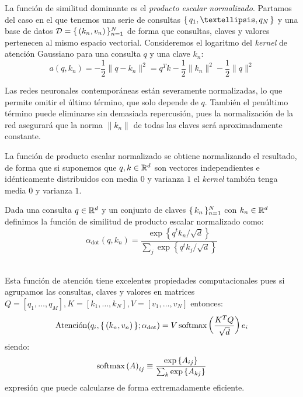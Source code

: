 La función de similitud dominante es el \textit{producto escalar normalizado}. Partamos del caso en el que tenemos una serie de consultas \( \Set{ q_1, …, q_N} \) y una base de datos \( \mathcal{D} = \{\,(k_n, v_n)\,\}_{n = 1}^N \) de forma que consultas, claves y valores pertenecen al mismo espacio vectorial. Consideremos el logaritmo del \textit{kernel} de atención Gaussiano para una consulta \( q \) y una clave \( k_{n} \):
\[
    a(q, k_n) = -\frac{1}{2} \|q - k_n\|^2  = q^T k - \frac{1}{2} \| k_n \|^2 - \frac{1}{2} \| q \|^2
\]

Las redes neuronales contemporáneas están severamente normalizadas, lo que permite omitir el último término, que solo depende de \( q \). También el penúltimo término puede eliminarse sin demasiada repercusión, pues la normalización de la red asegurará que la norma \( \| k_n \| \) de todas las claves será aproximadamente constante.

La función de producto escalar normalizado se obtiene normalizando el resultado, de forma que si suponemos que \( q, k \in \mathbb{R}^{d} \) son vectores independientes e idénticamente distribuidos con media \( 0 \) y varianza \( 1 \) el \textit{kernel} también tenga media \( 0 \) y varianza \( 1 \).

\begin{definition}
Dada una consulta \( q \in \mathbb{R}^{d}\) y un conjunto de claves \( \{\,k_n\,\}_{n = 1}^N \) con \( k_n \in \mathbb{R}^{d} \) definimos la función de similitud de producto escalar normalizado como:
\[
    \alpha_\text{dot}(q, k_{n}) = \frac{\exp \left\{q^t k_{n} / \sqrt{d} \right\}}{\sum_j \exp \left\{ q^t k_{j}/\sqrt{d} \right\}}
\]\
\end{definition}

Esta función de atención tiene excelentes propiedades computacionales pues si agrupamos las consultas, claves y valores en matrices \( Q = [q_1, …, q_{M}], K = [k_1, …, k_N], V = [v_1, …, v_N] \) entonces:
\begin{equation} \label{eq:dot_product}
    \operatorname{Atenci\acute{o}n}(q_i, \{\,(k_{n}, v_{n})\,\}; \alpha_\text{dot}) = V \operatorname{softmax} \left( \frac{K^T Q}{\sqrt{d}} \right) e_i
\end{equation}
siendo:
\[
    \operatorname{softmax} \left( A \right)_{ij} \equiv \frac{\exp \left\{ A_{ij} \right\}}{\sum_k \exp \left\{ A_{kj} \right\}}
\]
expresión que puede calcularse de forma extremadamente eficiente.

